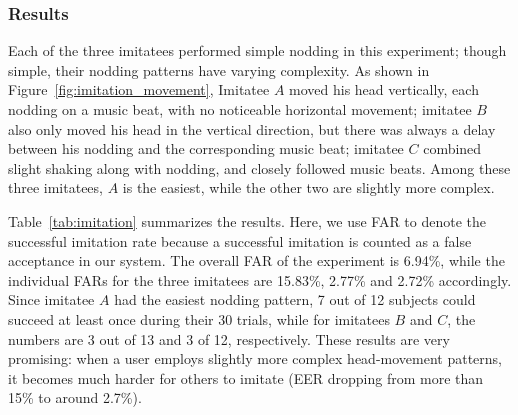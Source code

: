 \subsubsection{Results}
Each of the three imitatees performed simple nodding in this experiment; though simple, their nodding patterns have varying complexity. As shown in Figure~\ref{fig:imitation_movement}, Imitatee $A$ moved his head vertically, each nodding on a music beat, with no noticeable horizontal movement; imitatee $B$ also only moved his head in the vertical direction, but there was always a delay between his nodding and the corresponding music beat; imitatee $C$ combined slight shaking along with nodding, and closely followed music beats. Among these three imitatees, $A$ is the easiest, while the other two are slightly more complex.

Table~\ref{tab:imitation} summarizes the results. Here, we use FAR to denote the successful imitation rate because a successful imitation is counted as a false acceptance in our system. The overall FAR of the experiment is 6.94\%, while the individual FARs for the three imitatees are 15.83\%, 2.77\% and 2.72\% accordingly.  Since imitatee $A$ had the easiest nodding pattern, 7 out of 12 subjects could succeed at least once during their 30 trials, while for imitatees $B$ and $C$, the numbers are  3 out of 13 and 3 of 12, respectively. These results are very promising: when a user employs slightly more complex head-movement patterns, it becomes much harder for others to imitate (EER dropping from more than 15\% to around 2.7\%).




